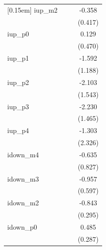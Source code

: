 \begin{table}[htbp]
\begin{tabular}{l*{3}{c}}
[0.15em]
iup\_m2              &                     &                     &      -0.358         \\
                    &                     &                     &     (0.417)         \\
[0.15em]
iup\_p0              &                     &                     &       0.129         \\
                    &                     &                     &     (0.470)         \\
[0.15em]
iup\_p1              &                     &                     &      -1.592         \\
                    &                     &                     &     (1.188)         \\
[0.15em]
iup\_p2              &                     &                     &      -2.103         \\
                    &                     &                     &     (1.543)         \\
[0.15em]
iup\_p3              &                     &                     &      -2.230         \\
                    &                     &                     &     (1.465)         \\
[0.15em]
iup\_p4              &                     &                     &      -1.303         \\
                    &                     &                     &     (2.326)         \\
[0.15em]
idown\_m4            &                     &                     &      -0.635         \\
                    &                     &                     &     (0.827)         \\
[0.15em]
idown\_m3            &                     &                     &      -0.957         \\
                    &                     &                     &     (0.597)         \\
[0.15em]
idown\_m2            &                     &                     &      -0.843\sym{***}\\
                    &                     &                     &     (0.295)         \\
[0.15em]
idown\_p0            &                     &                     &       0.485\sym{*}  \\
                    &                     &                     &     (0.287)         \\

\end{tabular}
\end{table}
